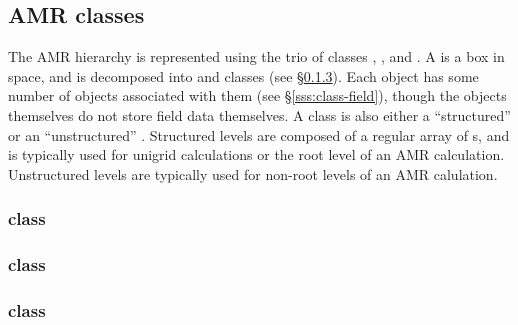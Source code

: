 \documentclass[10pt]{article}
\begin{document}
\subsection{AMR classes}

The AMR hierarchy is represented using the trio of classes
, , and .  A  is a
box in space, and is decomposed into  and
 classes (see \S\ref{sss:class-grid}).  Each
 object has some number of  objects
associated with them (see \S\ref{sss:class-field}), though the
 objects themselves do not store field data
themselves.  A  class is also either a ``structured''
 or an ``unstructured'' .
Structured levels are composed of a regular array of s, and
is typically used for unigrid calculations or the root level of an AMR
calculation.  Unstructured levels are typically used for non-root
levels of an AMR calulation.

\begin{center}
\end{center}

\subsubsection{ class} \label{sss:class-hierarchy}

\begin{center}
\end{center}

\subsubsection{ class} \label{sss:class-level}

\begin{center}
\end{center}

\subsubsection{ class} \label{sss:class-grid}
\end{document}
